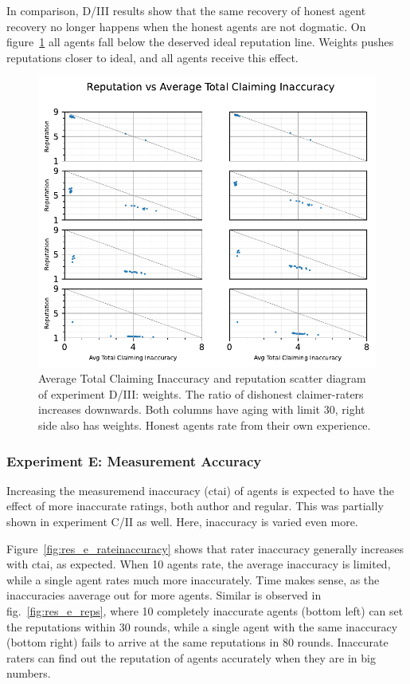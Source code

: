 \documentclass[%
    ]{\PathToTumTemplate/thesis/tum_thesis}
\begin{document}
In comparison, D/III results show that the same recovery of honest agent recovery no longer happens when the honest agents are not dogmatic.
On figure~\ref{fig:res_d3_scatter} all agents fall below the deserved ideal reputation line.
Weights pushes reputations closer to ideal, and all agents receive this effect.

\begin{figure}[tbp]
  \begin{center}
        \includegraphics[width=0.75\linewidth]	{../results/d3/AvgTotClaimInaccuracyAndReputationScatter_joined.pdf}
    \caption{
    Average Total Claiming Inaccuracy and reputation scatter diagram of experiment D/III: weights.
    The ratio of dishonest claimer-raters increases downwards.
    Both columns have aging with limit 30, right side also has weights.
    Honest agents rate from their own experience.
    }
    \label{fig:res_d3_scatter}
  \end{center}
\end{figure}

\subsubsection{Experiment E: Measurement Accuracy}
Increasing the measuremend inaccuracy (\gls{ctai}) of agents is expected to have the effect of more inaccurate ratings, both author and regular.
This was partially shown in experiment C/II as well.
Here, inaccuracy is varied even more.

Figure~\ref{fig:res_e_rateinaccuracy} shows that rater inaccuracy generally increases with \gls{ctai}, as expected.
When 10 agents rate, the average inaccuracy is limited, while a single agent rates much more inaccurately.
Time makes sense, as the inaccuracies aaverage out for more agents.
Similar is observed in fig.~\ref{fig:res_e_reps}, where 10 completely inaccurate agents (bottom left) can set the reputations within 30 rounds, while a single agent with the same inaccuracy (bottom right) fails to arrive at the same reputations in 80 rounds.
Inaccurate raters can find out the reputation of agents accurately when they are in big numbers.
\end{document}
